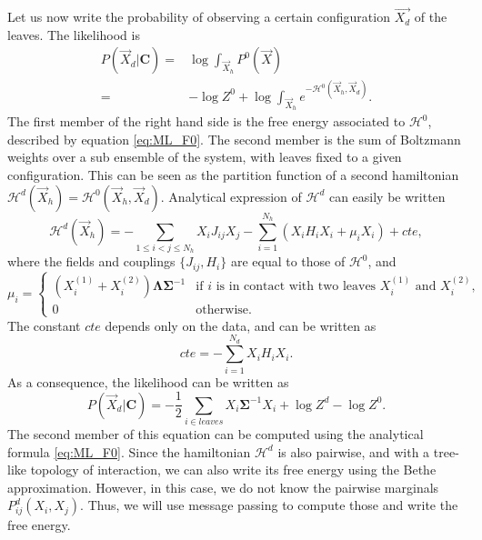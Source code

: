 \documentclass[10pt]{article}
\newcommand{\Lam}{\bm{\Lambda}}
\newcommand{\Sig}{\bm{\Sigma}}
\begin{document}
Let us now write the probability of observing a certain configuration $\vec{X_d}$ of the leaves. The likelihood is 
\begin{equation}
  \label{eq:ML_likelihood}
  \begin{split}
  P(\vec{X}_d | \bm{C}) =& \log \int_{\vec{X}_h} P^0(\vec{X})\\
               =& -\log Z^0 + \log\int_{\vec{X}_h} e^{-\mathcal{H}^0(\vec{X}_h,\vec{X}_d)}.
  \end{split}
\end{equation}
The first member of the right hand side is the free energy associated to $\mathcal{H}^0$, described by equation \ref{eq:ML_F0}. The second member is the sum of Boltzmann weights over a sub ensemble of the system, with leaves fixed to a given configuration. This can be seen as the partition function of a second hamiltonian $\mathcal{H}^d(\vec{X}_h) = \mathcal{H}^0(\vec{X}_h,\vec{X}_d)$. Analytical expression of $\mathcal{H}^d$ can easily be written
\begin{equation}
  \label{eq:ML_Hd}
  \mathcal{H}^d(\vec{X}_h) = -\sum_{1\leq i<j\leq N_h}X_iJ_{ij}X_j - \sum_{i=1}^{N_h} \left(X_iH_iX_i + \mu_i X_i\right) + cte,
\end{equation}
where the fields and couplings $\{J_{ij},H_i\}$ are equal to those of $\mathcal{H}^0$, and 
\begin{equation*}
  \label{eq:ML_mudef}
  \mu_i =
  \begin{cases}
  (X_i^{(1)} + X_i^{(2)})\Lam\Sig^{-1} & \text{if $i$ is in contact with two leaves $X_i^{(1)}$ and $X_i^{(2)}$} ,\\
  0 & \text{otherwise}.
  \end{cases}
\end{equation*}
The constant $cte$ depends only on the data, and can be written as 
\begin{equation}
  cte = - \sum_{i=1}^{N_d}X_iH_iX_i.
\end{equation}
As a consequence, the likelihood can be written as 
\begin{equation}
  \label{eq:ML_likelihood2}
  P(\vec{X}_d | \bm{C}) = -\frac{1}{2}\sum_{i\in leaves}X_i\Sig^{-1}X_i + \log Z^d -\log Z^0.
\end{equation}
The second member of this equation can be computed using the analytical formula \ref{eq:ML_F0}. Since the hamiltonian $\mathcal{H}^d$ is also pairwise, and with a tree-like topology of interaction, we can also write its free energy using the Bethe approximation. However, in this case, we do not know the pairwise marginals $P_{ij}^d(X_i,X_j)$. Thus, we will use message passing to compute those and write the free energy. \\
\end{document}
